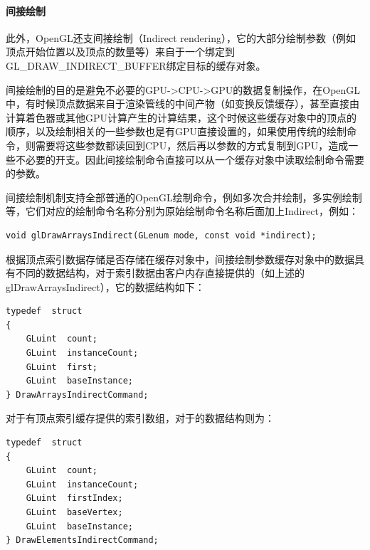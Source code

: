 \paragraph{间接绘制}
此外，OpenGL还支间接绘制（Indirect rendering），它的大部分绘制参数（例如顶点开始位置以及顶点的数量等）来自于一个绑定到GL\_DRAW\_INDIRECT\_BUFFER绑定目标的缓存对象。

间接绘制的目的是避免不必要的GPU->CPU->GPU的数据复制操作，在OpenGL中，有时候顶点数据来自于渲染管线的中间产物（如变换反馈缓存），甚至直接由计算着色器或其他GPU计算产生的计算结果，这个时候这些缓存对象中的顶点的顺序，以及绘制相关的一些参数也是有GPU直接设置的，如果使用传统的绘制命令，则需要将这些参数都读回到CPU，然后再以参数的方式复制到GPU，造成一些不必要的开支。因此间接绘制命令直接可以从一个缓存对象中读取绘制命令需要的参数。

间接绘制机制支持全部普通的OpenGL绘制命令，例如多次合并绘制，多实例绘制等，它们对应的绘制命令名称分别为原始绘制命令名称后面加上Indirect，例如：

\begin{lstlisting}
void glDrawArraysIndirect​(GLenum mode​, const void *indirect​);
\end{lstlisting}

根据顶点索引数据存储是否存储在缓存对象中，间接绘制参数缓存对象中的数据具有不同的数据结构，对于索引数据由客户内存直接提供的（如上述的glDrawArraysIndirect），它的数据结构如下：

\begin{lstlisting}
typedef  struct 
{
   	GLuint  count;
   	GLuint  instanceCount;
   	GLuint  first;
   	GLuint  baseInstance;
} DrawArraysIndirectCommand;
\end{lstlisting}

对于有顶点索引缓存提供的索引数组，对于的数据结构则为：

\begin{lstlisting}
typedef  struct 
{
    GLuint  count;
    GLuint  instanceCount;
    GLuint  firstIndex;
    GLuint  baseVertex;
    GLuint  baseInstance;
} DrawElementsIndirectCommand;
\end{lstlisting}


